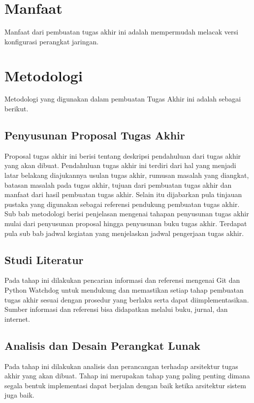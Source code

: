 	\section{Manfaat}
    	Manfaat dari pembuatan tugas akhir ini adalah mempermudah melacak versi konfigurasi perangkat jaringan.\\
    	
   	\section{Metodologi}
   		Metodologi yang digunakan dalam pembuatan Tugas Akhir ini adalah sebagai berikut.
   		
   		\subsection{Penyusunan Proposal Tugas Akhir}
   			Proposal tugas akhir ini berisi tentang deskripsi pendahuluan dari tugas akhir yang akan dibuat. Pendahuluan tugas akhir ini terdiri dari hal yang menjadi latar belakang diajukannya usulan tugas akhir, rumusan masalah yang diangkat, batasan masalah pada tugas akhir, tujuan dari pembuatan tugas akhir dan manfaat dari hasil pembuatan tugas akhir. Selain itu dijabarkan pula tinjauan pustaka yang digunakan sebagai referensi pendukung pembuatan tugas akhir. Sub bab metodologi berisi penjelasan mengenai tahapan penyusunan tugas akhir mulai dari penyusunan proposal hingga penyusunan buku tugas akhir. Terdapat pula sub bab jadwal kegiatan yang menjelaskan jadwal pengerjaan tugas akhir.
   			
 		\subsection{Studi Literatur}
 			Pada tahap ini dilakukan pencarian informasi dan referensi mengenai Git dan Python Watchdog untuk mendukung dan memastikan setiap tahap pembuatan tugas akhir sesuai dengan prosedur yang berlaku serta dapat diimplementasikan. Sumber informasi dan referensi bisa didapatkan melalui buku, jurnal, dan internet.
 		\subsection{Analisis dan Desain Perangkat Lunak}
 			Pada tahap ini dilakukan analisis dan perancangan terhadap arsitektur tugas akhir yang akan dibuat. Tahap ini merupakan tahap yang paling penting dimana segala bentuk implementasi dapat berjalan dengan baik ketika arsitektur sistem juga baik. 
